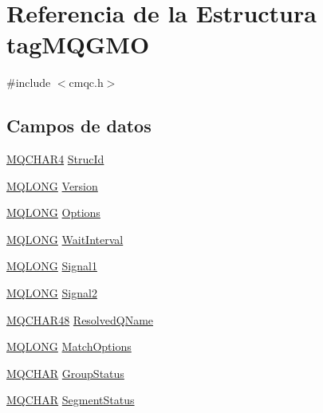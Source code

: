 \hypertarget{structtag_m_q_g_m_o}{}\section{Referencia de la Estructura tag\+M\+Q\+G\+M\+O}
\label{structtag_m_q_g_m_o}


{\ttfamily \#include $<$cmqc.\+h$>$}

\subsection*{Campos de datos}
\begin{DoxyCompactItemize}
\item 
\hyperlink{cmqc_8h_a12590e546ed66fda7cf21c1d5cefa31d}{M\+Q\+C\+H\+A\+R4} \hyperlink{structtag_m_q_g_m_o_a0530922ca944569b52601d74941f96e4}{Struc\+Id}
\item 
\hyperlink{cmqc_8h_a1fb8d28cbda3fa8766a9821230cdb6d5}{M\+Q\+L\+O\+N\+G} \hyperlink{structtag_m_q_g_m_o_a0656ef8f766b3907d394d88a35d7b7e9}{Version}
\item 
\hyperlink{cmqc_8h_a1fb8d28cbda3fa8766a9821230cdb6d5}{M\+Q\+L\+O\+N\+G} \hyperlink{structtag_m_q_g_m_o_ad7aff2d6c6044809464380998d24ec5c}{Options}
\item 
\hyperlink{cmqc_8h_a1fb8d28cbda3fa8766a9821230cdb6d5}{M\+Q\+L\+O\+N\+G} \hyperlink{structtag_m_q_g_m_o_a6f3538bd01d237755fd6ab7dad5584d0}{Wait\+Interval}
\item 
\hyperlink{cmqc_8h_a1fb8d28cbda3fa8766a9821230cdb6d5}{M\+Q\+L\+O\+N\+G} \hyperlink{structtag_m_q_g_m_o_a07b74d87b8eed659f524ba2c5c7dcb09}{Signal1}
\item 
\hyperlink{cmqc_8h_a1fb8d28cbda3fa8766a9821230cdb6d5}{M\+Q\+L\+O\+N\+G} \hyperlink{structtag_m_q_g_m_o_afd4b361a08ee7dc496e720908aa9917a}{Signal2}
\item 
\hyperlink{cmqc_8h_a53b1a2836da03f19144836725ff77919}{M\+Q\+C\+H\+A\+R48} \hyperlink{structtag_m_q_g_m_o_aec4a06d696b4370f0c86b129d9f868ca}{Resolved\+Q\+Name}
\item 
\hyperlink{cmqc_8h_a1fb8d28cbda3fa8766a9821230cdb6d5}{M\+Q\+L\+O\+N\+G} \hyperlink{structtag_m_q_g_m_o_a64325fedf5fee7e9b76f1ad26dceac2b}{Match\+Options}
\item 
\hyperlink{cmqc_8h_aeb12bc7ba416a4eb603e2a74351418d2}{M\+Q\+C\+H\+A\+R} \hyperlink{structtag_m_q_g_m_o_a20c00b3295996b9ddbf0ed94ad5a2f57}{Group\+Status}
\item 
\hyperlink{cmqc_8h_aeb12bc7ba416a4eb603e2a74351418d2}{M\+Q\+C\+H\+A\+R} \hyperlink{structtag_m_q_g_m_o_a6184b6f6e6a01791ae04e35015fb3bd7}{Segment\+Status}

\end{DoxyCompactItemize}
